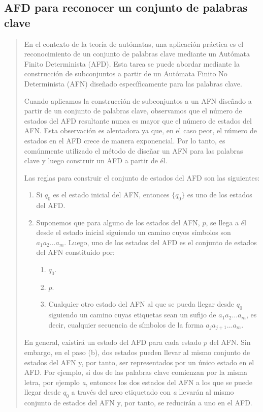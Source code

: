 \documentclass{article}
\begin{document}
    \subsection{AFD para reconocer un conjunto de palabras clave}
    \begin{quote}
        En el contexto de la teoría de autómatas, una aplicación práctica es el reconocimiento de un conjunto de palabras clave mediante un
        Autómata Finito Determinista (AFD). Esta tarea se puede abordar mediante la construcción de subconjuntos a partir de un Autómata
        Finito No Determinista (AFN) diseñado específicamente para las palabras clave.

        Cuando aplicamos la construcción de subconjuntos a un AFN diseñado a partir de un conjunto de palabras clave, observamos que el
        número de estados del AFD resultante nunca es mayor que el número de estados del AFN.{\@} Esta observación es alentadora ya que, en
        el caso peor, el número de estados en el AFD crece de manera exponencial. Por lo tanto, es comúnmente utilizado el método de
        diseñar un AFN para las palabras clave y luego construir un AFD a partir de él.

        Las reglas para construir el conjunto de estados del AFD son las siguientes:

        \begin{enumerate}[label=\alph*)]
            \item Si \(q_0\) es el estado inicial del AFN, entonces \(\{q_0\}\) es uno de los estados del AFD{\@}.

            \item Suponemos que para alguno de los estados del AFN, \(p\), se llega a él desde el estado inicial siguiendo un camino cuyos
            símbolos son \(a_1 a_2 \dots a_m\). Luego, uno de los estados del AFD es el conjunto de estados del AFN constituido por:
            \begin{enumerate}[label=\arabic*.]
                \item \(q_0\).
                \item \(p\).
                \item Cualquier otro estado del AFN al que se pueda llegar desde \(q_0\) siguiendo un camino cuyas etiquetas sean un
                sufijo de \(a_1 a_2 \dots a_m\), es decir, cualquier secuencia de símbolos de la forma \(a_j a_{j+1} \dots a_m\).
            \end{enumerate}
        \end{enumerate}

        En general, existirá un estado del AFD para cada estado \(p\) del AFN.{\@} Sin embargo, en el paso (b), dos estados pueden llevar
        al mismo conjunto de estados del AFN y, por tanto, ser representados por un único estado en el AFD.{\@} Por ejemplo, si dos de las
        palabras clave comienzan por la misma letra, por ejemplo \textit{a}, entonces los dos estados del AFN a los que se puede llegar desde
        \(q_0\) a través del arco etiquetado con \textit{a} llevarán al mismo conjunto de estados del AFN y, por tanto, se reducirán a
        uno en el AFD.{\@}\cite{hopcroft2007introduccion}
    \end{quote}
\end{document}
